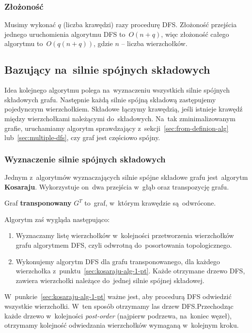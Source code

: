 \documentclass[a4paper,12pt]{mwart}
\begin{document}
\subsubsection{Złożoność}

Musimy wykonać $q$ (liczba krawędzi) razy procedurę DFS\@. Złożoność przejścia
jednego uruchomienia algorytmu DFS to~$O(n + q)$, więc złożoność całego
algorytmu to~$O(q(n + q))$, gdzie $n$ -- liczba wierzchołków.

\subsection{Bazujący na~silnie spójnych składowych}

Idea kolejnego algorytmu polega na~wyznaczeniu wszystkich silnie spójnych
składowych grafu. Następnie każdą silnie spójną składową zastępujemy
pojedynczym wierzchołkiem. Składowe łączymy krawędzią, jeśli istnieje krawędź
między wierzchołkami należącymi do~składowych. Na~tak zminimalizowanym grafie,
uruchamiamy algorytm sprawdzający z~sekcji~\ref{sec:from-definion-alg}
lub~\ref{sec:multiple-dfs}, czy graf jest częściowo spójny.


\subsubsection{Wyznaczenie silnie spójnych składowych}

Jednym z~algorytmów wyznaczających silnie spójne składowe grafu jest~algorytm
\textbf{Kosaraju}. Wykorzystuje on~dwa przejścia w~głąb oraz transpozycję
grafu.

Graf \textbf{transponowany} $G^T$ to~graf, w~którym krawędzie są~odwrócone.

Algorytm zaś wygląda następująco:

\begin{enumerate}
\item\label{sec:kosaraju-alg-1-pt} Wyznaczamy listę wierzchołków w~kolejności
  przetworzenia wierzchołków grafu algorytmem DFS, czyli odwrotną
  do~posortowania topologicznego.
\item\label{sec:kosaraju-alg-2-pt} Wykonujemy algorytm DFS dla grafu
  transponowanego, dla każdego wierzchołka
  z~punktu~\ref{sec:kosaraju-alg-1-pt}. Każde otrzymane drzewo DFS, zawiera
  wierzchołki należące do~jednej silnie spójnej składowej.
\end{enumerate}

W~punkcie~\ref{sec:kosaraju-alg-1-pt} ważne jest, aby procedurą DFS odwiedzić
wszystkie wierzchołki. W~ten sposób otrzymamy las drzew DFS.\@ Przechodząc
każde drzewo w~kolejności \emph{post-order} (najpierw podrzewa, na~koniec
węzeł), otrzymamy kolejność odwiedzania wierzchołków wymaganą w~kolejnym kroku.
\end{document}
